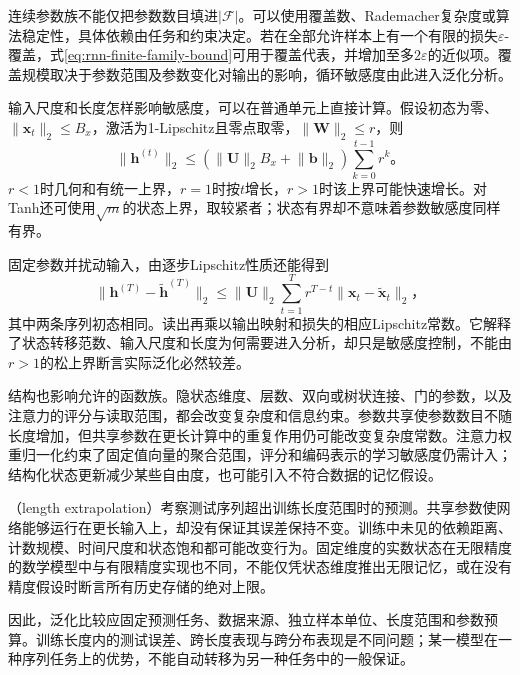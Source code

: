 连续参数族不能仅把参数数目填进$|\mathcal{F}|$。可以使用覆盖数、Rademacher复杂度或算法稳定性，具体依赖由任务和约束决定。若在全部允许样本上有一个有限的损失$\varepsilon$-覆盖，式\eqref{eq:rnn-finite-family-bound}可用于覆盖代表，并增加至多$2\varepsilon$的近似项。覆盖规模取决于参数范围及参数变化对输出的影响，循环敏感度由此进入泛化分析。

输入尺度和长度怎样影响敏感度，可以在普通单元上直接计算。假设初态为零、$\lVert\bm{x}_t\rVert_2\leq B_x$，激活为1-Lipschitz且零点取零，$\lVert\bm{W}\rVert_2\leq r$，则
\begin{equation}
  \lVert\bm{h}^{(t)}\rVert_2
    \leq\left(\lVert\bm{U}\rVert_2 B_x+\lVert\bm{b}\rVert_2\right)
       \sum_{k=0}^{t-1}r^k\text{。}
  \label{eq:rnn-state-norm-bound}
\end{equation}
$r<1$时几何和有统一上界，$r=1$时按$t$增长，$r>1$时该上界可能快速增长。对Tanh还可使用$\sqrt m$的状态上界，取较紧者；状态有界却不意味着参数敏感度同样有界。

固定参数并扰动输入，由逐步Lipschitz性质还能得到
\begin{equation}
  \lVert\bm{h}^{(T)}-\widetilde{\bm{h}}^{(T)}\rVert_2
    \leq\lVert\bm{U}\rVert_2
      \sum_{t=1}^{T}r^{T-t}\lVert\bm{x}_t-\widetilde{\bm{x}}_t\rVert_2\text{，}
  \label{eq:rnn-input-sensitivity}
\end{equation}
其中两条序列初态相同。读出再乘以输出映射和损失的相应Lipschitz常数。它解释了状态转移范数、输入尺度和长度为何需要进入分析，却只是敏感度控制，不能由$r>1$的松上界断言实际泛化必然较差。

结构也影响允许的函数族。隐状态维度、层数、双向或树状连接、门的参数，以及注意力的评分与读取范围，都会改变复杂度和信息约束。参数共享使参数数目不随长度增加，但共享参数在更长计算中的重复作用仍可能改变复杂度常数。注意力权重归一化约束了固定值向量的聚合范围，评分和编码表示的学习敏感度仍需计入；结构化状态更新减少某些自由度，也可能引入不符合数据的记忆假设。

（length extrapolation）考察测试序列超出训练长度范围时的预测。共享参数使网络能够运行在更长输入上，却没有保证其误差保持不变。训练中未见的依赖距离、计数规模、时间尺度和状态饱和都可能改变行为。固定维度的实数状态在无限精度的数学模型中与有限精度实现也不同，不能仅凭状态维度推出无限记忆，或在没有精度假设时断言所有历史存储的绝对上限。

因此，泛化比较应固定预测任务、数据来源、独立样本单位、长度范围和参数预算。训练长度内的测试误差、跨长度表现与跨分布表现是不同问题；某一模型在一种序列任务上的优势，不能自动转移为另一种任务中的一般保证。

